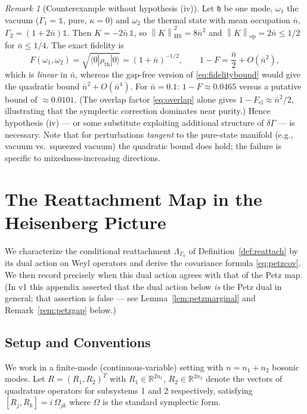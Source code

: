 \documentclass[11pt,a4paper]{article}
\newcommand{\idm}{\mathds{1}}}{\newcommand{\idm}{\mathbf{1}}}
\theoremstyle{plain}
\theoremstyle{definition}
\theoremstyle{remark}
\newtheorem{remark}[theorem]{Remark}
\newcommand{\hh}{\mathfrak{h}}
\newcommand{\R}{\mathbb{R}}
\newcommand{\opnorm}[1]{\left\lVert #1 \right\rVert_{\mathrm{op}}}
\newcommand{\hsnorm}[1]{\left\lVert #1 \right\rVert_{\mathrm{HS}}}
\begin{document}
\begin{remark}[Counterexample without hypothesis (iv)]\label{rem:counterexample}
Let $\hh$ be one mode, $\omega_1$ the vacuum ($\Gamma_1 = \idm$, pure,
$\kappa = 0$) and $\omega_2$ the thermal state with mean occupation $\bar{n}$,
$\Gamma_2 = (1 + 2\bar{n})\idm$. Then
$K = -2\bar{n}\,\idm$, so $\hsnorm{K}^2 = 8\bar{n}^2$ and
$\opnorm{K} = 2\bar{n} \le 1/2$ for $\bar{n} \le 1/4$. The exact fidelity is
\begin{equation}
F(\omega_1,\omega_2) = \sqrt{\langle 0|\rho_{\mathrm{th}}|0\rangle}
= (1 + \bar{n})^{-1/2},
\qquad 1 - F = \frac{\bar{n}}{2} + O(\bar{n}^2),
\end{equation}
which is \emph{linear} in $\bar{n}$, whereas the gap-free version of
\eqref{eq:fidelitybound} would give the quadratic bound
$\bar{n}^2 + O(\bar{n}^4)$. For $\bar{n} = 0.1$: $1 - F \approx 0.0465$ versus a
putative bound of $\approx 0.0101$. (The overlap factor \eqref{eq:overlap} alone
gives $1 - F_{\mathrm{cl}} \approx \bar{n}^2/2$, illustrating that the symplectic
correction dominates near purity.) Hence hypothesis (iv) --- or some substitute
exploiting additional structure of $\delta\Gamma$ --- is necessary. Note that for
perturbations \emph{tangent} to the pure-state manifold (e.g., vacuum vs.\
squeezed vacuum) the quadratic bound does hold; the failure is specific to
mixedness-increasing directions.
\end{remark}

\section{The Reattachment Map in the Heisenberg Picture}\label{app:conditional}

We characterize the conditional reattachment $\Lambda_{\Gamma_0}$ of
Definition~\ref{def:reattach} by its dual action on Weyl operators and derive the
covariance formula \eqref{eq:petzcov}. We then record precisely when this dual
action agrees with that of the Petz map. (In v1 this appendix asserted that the
dual action below \emph{is} the Petz dual in general; that assertion is false ---
see Lemma~\ref{lem:petzmarginal} and Remark~\ref{rem:petzgap} below.)

\subsection{Setup and Conventions}

We work in a finite-mode (continuous-variable) setting with $n = n_1 + n_2$ bosonic
modes. Let $R = (R_1, R_2)^T$ with $R_1 \in \R^{2n_1}$, $R_2 \in \R^{2n_2}$ denote
the vectors of quadrature operators for subsystems 1 and 2 respectively, satisfying
$[R_j, R_k] = i\,\Omega_{jk}$ where $\Omega$ is the standard symplectic form.
\end{document}
